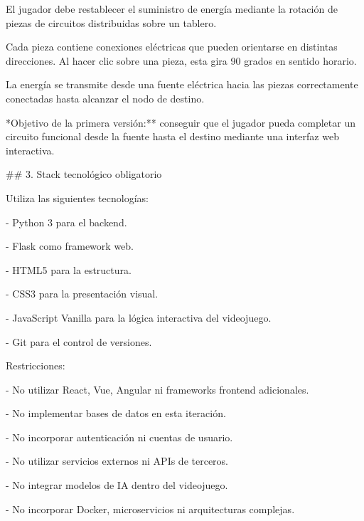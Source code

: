 \noindent El jugador debe restablecer el suministro de energía mediante la rotación de piezas de circuitos distribuidas sobre un tablero.\par
\par\smallskip
\noindent Cada pieza contiene conexiones eléctricas que pueden orientarse en distintas direcciones. Al hacer clic sobre una pieza, esta gira 90 grados en sentido horario.\par
\par\smallskip
\noindent La energía se transmite desde una fuente eléctrica hacia las piezas correctamente conectadas hasta alcanzar el nodo de destino.\par
\par\smallskip
\noindent **Objetivo de la primera versión:** conseguir que el jugador pueda completar un circuito funcional desde la fuente hasta el destino mediante una interfaz web interactiva.\par
\par\smallskip
\noindent \#\# 3. Stack tecnológico obligatorio\par
\par\smallskip
\noindent Utiliza las siguientes tecnologías:\par
\par\smallskip
\noindent - Python 3 para el backend.\par
\noindent - Flask como framework web.\par
\noindent - HTML5 para la estructura.\par
\noindent - CSS3 para la presentación visual.\par
\noindent - JavaScript Vanilla para la lógica interactiva del videojuego.\par
\noindent - Git para el control de versiones.\par
\par\smallskip
\noindent Restricciones:\par
\par\smallskip
\noindent - No utilizar React, Vue, Angular ni frameworks frontend adicionales.\par
\noindent - No implementar bases de datos en esta iteración.\par
\noindent - No incorporar autenticación ni cuentas de usuario.\par
\noindent - No utilizar servicios externos ni APIs de terceros.\par
\noindent - No integrar modelos de IA dentro del videojuego.\par
\noindent - No incorporar Docker, microservicios ni arquitecturas complejas.\par
